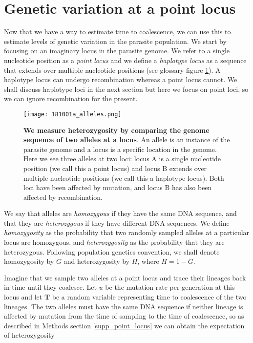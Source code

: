 \documentclass[_main.tex]{subfiles}
\begin{document}
\section*{Genetic variation at a point locus} 
\label{main_point_locus}

Now that we have a way to estimate time to coalescence, we can use this to estimate levels of genetic variation in the parasite population.  We start by focusing on an imaginary locus in the parasite genome.  We refer to a single nucleotide position as a \textit{point locus} and we define a \textit{haplotype locus} as a sequence that extends over multiple nucleotide positions (see glossary figure \ref{fig:supp_graph_17}).  A haplotype locus can undergo recombination whereas a point locus cannot.  We shall discuss haplotype loci in the next section but here we focus on point loci, so we can ignore recombination for the present.

\begin{figure}[h!]
\centering
\texttt{[image: 181001a\_alleles.png]}
\caption{\textbf{We measure heterozygosity by comparing the genome sequence of two alleles at a locus}. An allele is an instance of the parasite genome and a locus is a specific location in the genome.  Here we see three alleles at two loci: locus A is a single nucleotide position (we call this a point locus) and locus B extends over multiple nucleotide positions (we call this a haplotype locus).  Both loci have been affected by mutation, and locus B has also been affected by recombination.}
\label{fig:supp_graph_17}
\end{figure}

We say that alleles are \textit{homozygous} if they have the same DNA sequence, and that they are \textit{heterozygous} if they have different DNA sequences.  We define \textit{homozygosity} as the probability that two randomly sampled alleles at a particular locus are homozygous, and \textit{heterozygosity} as the probability that they are heterozygous.  Following population genetics convention, we shall denote homozygosity by $G$ and heterozygosity by $H$, where $H = 1 - G$.

Imagine that we sample two alleles at a point locus and trace their lineages back in time until they coalesce.  Let $u$ be the mutation rate per generation at this locus and let \textbf{T} be a random variable representing time to coalescence of the two lineages.  The two alleles must have the same DNA sequence if neither lineage is affected by mutation from the time of sampling to the time of coalescence, so as described in Methods section \ref{supp_point_locus} we can obtain the expectation of heterozygosity
\end{document}
